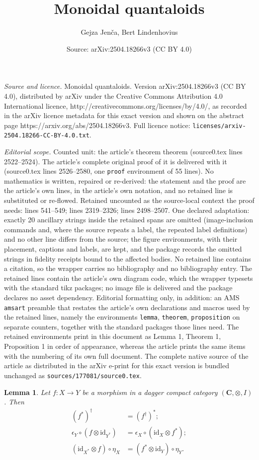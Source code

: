 \documentclass[10pt,a4paper]{amsart}
\title{Monoidal quantaloids}
\author{Gejza Jen\v{c}a, Bert Lindenhovius}
\date{Source: arXiv:2504.18266v3 (CC BY 4.0)}
\newtheorem{lemma}{Lemma}
\newcommand{\id}{\mathrm{id}}
\begin{document}
\maketitle

\noindent\emph{Source and licence.} Monoidal quantaloids. Version arXiv:2504.18266v3 (CC BY 4.0), distributed by arXiv under the Creative Commons Attribution 4.0 International licence, http://creativecommons.org/licenses/by/4.0/, as recorded in the arXiv licence metadata for this exact version and shown on the abstract page https://arxiv.org/abs/2504.18266v3. Full licence notice: \texttt{licenses/arxiv-2504.18266-CC-BY-4.0.txt}.\par\smallskip

\noindent\textit{Editorial scope.} Counted unit: the article's theorem theorem (source0.tex lines 2522--2524). The article's complete original proof of it is delivered with it (source0.tex lines 2526--2580, one \texttt{proof} environment of 55 lines). No mathematics is written, repaired or re-derived: the statement and the proof are the article's own lines, in the article's own notation, and no retained line is substituted or re-flowed.  Retained uncounted as the source-local context the proof needs: lines 541--549; lines 2319--2326; lines 2498--2507.  One declared adaptation: exactly 20 ancillary strings inside the retained spans are omitted (image-inclusion commands and, where the source repeats a label, the repeated label definitions) and no other line differs from the source; the figure environments, with their placement, captions and labels, are kept, and the package records the omitted strings in fidelity receipts bound to the affected bodies.  No retained line contains a citation, so the wrapper carries no bibliography and no bibliography entry.  The retained lines contain the article's own diagram code, which the wrapper typesets with the standard tikz packages; no image file is delivered and the package declares no asset dependency.  Editorial formatting only, in addition: an AMS \texttt{amsart} preamble that restates the article's own declarations and macros used by the retained lines, namely the environments \texttt{lemma}, \texttt{theorem}, \texttt{proposition} on separate counters, together with the standard packages those lines need.  The retained environments print in this document as Lemma 1, Theorem 1, Proposition 1 in order of appearance, whereas the article prints the same items with the numbering of its own full document.  The complete native source of the article as distributed in the arXiv e-print for this exact version is bundled unchanged as \texttt{sources/177081/source0.tex}.
\begin{lemma}\label{lem:dagger_and_dual}
    Let $f:X\to Y$ be a morphism in a dagger compact category $(\mathbf C,\otimes, I)$. 
    Then 
    \begin{align*}
        (f^*)^\dag & =(f^\dag)^*;\\
        \epsilon_Y\circ(f\otimes \id_{Y^*}) & = \epsilon_X\circ(\id_X\otimes f^*);\\
        (\id_{X^*}\otimes f)\circ \eta_X & =(f^*\otimes \id_Y)\circ \eta_Y.
          \end{align*}
\end{lemma}
\end{document}
